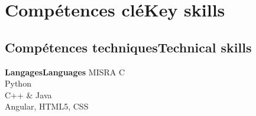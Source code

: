 \vspace{-1.3cm}

\ifnativelang
\newcommand{\CVheader}{6 ann\'ees d'exp\'erience en syst\`emes embarqu\'es critiques et r\'eseaux.}%
\else
\newcommand{\CVheader}{6+ years of experience in Real-Time systems, embedded linux and networking.\\
Experience in project steering and team management.}
\fi


\section{\ifnativelang Comp\'etences cl\'e\else Key skills\fi}

\ifaddmngt
\subsection{\ifnativelang Comp\'etences techniques\else Technical skills\fi}
\fi

{\ifnativelang\textbf{Langages}\else \textbf{Languages}\fi}{
 MISRA C \\%
 Python\\
 C++ \& Java \\
 Angular, HTML5, CSS
}

